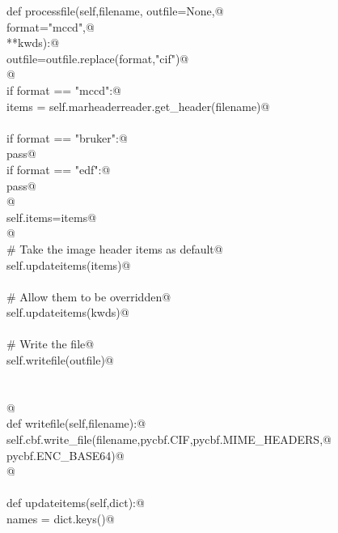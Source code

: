 \documentclass[10pt,a4paper,twoside,notitlepage]{article}
\begin{document}
\begin{flushleft}
\begin{list}{}{}
\mbox{}\verb@    def processfile(self,filename, outfile=None,@\\
\mbox{}\verb@                    format="mccd",@\\
\mbox{}\verb@                    **kwds):@\\
\mbox{}\verb@        outfile=outfile.replace(format,"cif")@\\
\mbox{}\verb@        @\\
\mbox{}\verb@        if format == "mccd":@\\
\mbox{}\verb@            items = self.marheaderreader.get_header(filename)@\\
\mbox{}\verb@@\\
\mbox{}\verb@        if format == "bruker":@\\
\mbox{}\verb@            pass@\\
\mbox{}\verb@        if format == "edf":@\\
\mbox{}\verb@            pass@\\
\mbox{}\verb@        @\\
\mbox{}\verb@        self.items=items@\\
\mbox{}\verb@        @\\
\mbox{}\verb@        # Take the image header items as default@\\
\mbox{}\verb@        self.updateitems(items)@\\
\mbox{}\verb@@\\
\mbox{}\verb@        # Allow them to be overridden@\\
\mbox{}\verb@        self.updateitems(kwds)@\\
\mbox{}\verb@@\\
\mbox{}\verb@        # Write the file@\\
\mbox{}\verb@        self.writefile(outfile)@\\
\mbox{}\verb@@\\
\mbox{}\verb@@\\
\mbox{}\verb@        @\\
\mbox{}\verb@    def writefile(self,filename):@\\
\mbox{}\verb@        self.cbf.write_file(filename,pycbf.CIF,pycbf.MIME_HEADERS,@\\
\mbox{}\verb@                            pycbf.ENC_BASE64)@\\
\mbox{}\verb@        @\\
\mbox{}\verb@@\\
\mbox{}\verb@    def updateitems(self,dict):@\\
\mbox{}\verb@        names = dict.keys()@\\

\end{list}
\end{flushleft}
\end{document}
